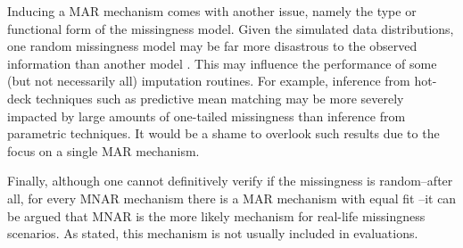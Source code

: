 \documentclass[bimj,fleqn]{w-art}
\begin{document}
Inducing a MAR mechanism comes with another issue, namely the type or functional form of the missingness model. Given the simulated data distributions, one random missingness model may be far more disastrous to the observed information than another model \citep{scho18}. This may influence the performance of some (but not necessarily all) imputation routines. For example, inference from hot-deck techniques such as predictive mean matching \citep{little1988missing, rubin1986statistical} may be more severely impacted by large amounts of one-tailed missingness than inference from parametric techniques. It would be a shame to overlook such results due to the focus on a single MAR mechanism.



Finally, although one cannot definitively verify if the missingness is random--after all, for every MNAR mechanism there is a MAR mechanism with equal fit \citep{molenberghs2008every}--it can be argued that MNAR is the more likely mechanism for real-life missingness scenarios. As stated, this mechanism is not usually included in evaluations.  %

\end{document}
